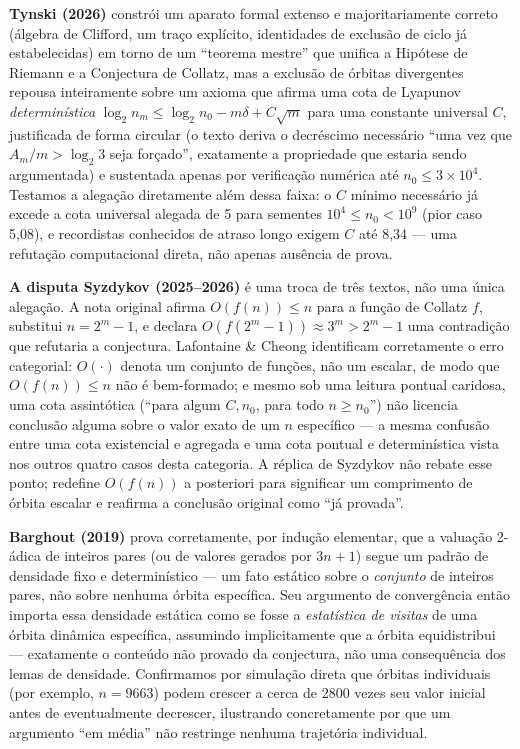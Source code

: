 \documentclass[11pt]{article}
\begin{document}
\textbf{Tynski (2026)} \cite{Tynski2026} constrói um aparato formal
extenso e majoritariamente correto (álgebra de Clifford, um traço
explícito, identidades de exclusão de ciclo já estabelecidas) em torno
de um ``teorema mestre'' que unifica a Hipótese de Riemann e a
Conjectura de Collatz, mas a exclusão de órbitas divergentes repousa
inteiramente sobre um axioma que afirma uma cota de Lyapunov
\emph{determinística}
$\log_2 n_m \le \log_2 n_0 - m\delta + C\sqrt m$ para uma constante
universal $C$, justificada de forma circular (o texto deriva o
decréscimo necessário ``uma vez que $A_m/m > \log_2 3$ seja forçado'',
exatamente a propriedade que estaria sendo argumentada) e sustentada
apenas por verificação numérica até $n_0 \le 3\times 10^4$. Testamos a
alegação diretamente além dessa faixa: o $C$ mínimo necessário já
excede a cota universal alegada de 5 para sementes
$10^4 \le n_0 < 10^9$ (pior caso 5,08), e recordistas conhecidos de
atraso longo exigem $C$ até 8,34 --- uma refutação computacional
direta, não apenas ausência de prova.

\textbf{A disputa Syzdykov (2025--2026)}
\cite{Syzdykov2025,Syzdykov2026,LafontaineCheong2026} é uma troca de
três textos, não uma única alegação. A nota original \cite{Syzdykov2025}
afirma $O(f(n)) \le n$ para a função de Collatz $f$, substitui
$n = 2^m-1$, e declara $O(f(2^m-1)) \approx 3^m > 2^m - 1$ uma
contradição que refutaria a conjectura. Lafontaine \& Cheong
\cite{LafontaineCheong2026} identificam corretamente o erro categorial:
$O(\cdot)$ denota um conjunto de funções, não um escalar, de modo que
$O(f(n)) \le n$ não é bem-formado; e mesmo sob uma leitura pontual
caridosa, uma cota assintótica (``para algum $C,n_0$, para todo
$n \ge n_0$'') não licencia conclusão alguma sobre o valor exato de um
$n$ específico --- a mesma confusão entre uma cota existencial e
agregada e uma cota pontual e determinística vista nos outros quatro
casos desta categoria. A réplica de Syzdykov \cite{Syzdykov2026} não
rebate esse ponto; redefine $O(f(n))$ a posteriori para significar um
comprimento de órbita escalar e reafirma a conclusão original como
``já provada''.

\textbf{Barghout (2019)} \cite{Barghout2019} prova corretamente, por
indução elementar, que a valuação 2-ádica de inteiros pares (ou de
valores gerados por $3n+1$) segue um padrão de densidade fixo e
determinístico --- um fato estático sobre o \emph{conjunto} de inteiros
pares, não sobre nenhuma órbita específica. Seu argumento de
convergência então importa essa densidade estática como se fosse a
\emph{estatística de visitas} de uma órbita dinâmica específica,
assumindo implicitamente que a órbita equidistribui --- exatamente o
conteúdo não provado da conjectura, não uma consequência dos lemas de
densidade. Confirmamos por simulação direta que órbitas individuais
(por exemplo, $n=9663$) podem crescer a cerca de 2800 vezes seu valor
inicial antes de eventualmente decrescer, ilustrando concretamente por
que um argumento ``em média'' não restringe nenhuma trajetória
individual.
\end{document}
